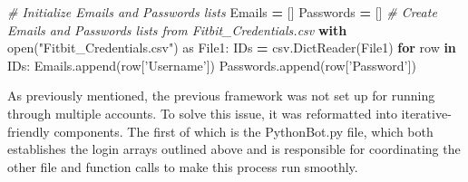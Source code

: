 \documentclass[]{book}
\newenvironment{Shaded}{\begin{snugshade}}{\end{snugshade}}
\newcommand{\BuiltInTok}[1]{#1}
\newcommand{\CommentTok}[1]{\textcolor[rgb]{0.56,0.35,0.01}{\textit{#1}}}
\newcommand{\ControlFlowTok}[1]{\textcolor[rgb]{0.13,0.29,0.53}{\textbf{#1}}}
\newcommand{\ImportTok}[1]{#1}
\newcommand{\KeywordTok}[1]{\textcolor[rgb]{0.13,0.29,0.53}{\textbf{#1}}}
\newcommand{\NormalTok}[1]{#1}
\newcommand{\OperatorTok}[1]{\textcolor[rgb]{0.81,0.36,0.00}{\textbf{#1}}}
\newcommand{\StringTok}[1]{\textcolor[rgb]{0.31,0.60,0.02}{#1}}
\begin{document}
\begin{Shaded}
\begin{Highlighting}[]
\CommentTok{# Initialize Emails and Passwords lists}
\NormalTok{Emails }\OperatorTok{=}\NormalTok{ []}
\NormalTok{Passwords }\OperatorTok{=}\NormalTok{ []}
\CommentTok{# Create Emails and Passwords lists from Fitbit_Credentials.csv}
\ControlFlowTok{with} \BuiltInTok{open}\NormalTok{(}\StringTok{"Fitbit_Credentials.csv"}\NormalTok{) }\ImportTok{as}\NormalTok{ File1:}
\NormalTok{    IDs }\OperatorTok{=}\NormalTok{ csv.DictReader(File1)}
    \ControlFlowTok{for}\NormalTok{ row }\KeywordTok{in}\NormalTok{ IDs:}
\NormalTok{        Emails.append(row[}\StringTok{'Username'}\NormalTok{])}
\NormalTok{        Passwords.append(row[}\StringTok{'Password'}\NormalTok{])}
\end{Highlighting}
\end{Shaded}

As previously mentioned, the previous framework was not set up for running through multiple accounts. To solve this issue, it was reformatted into iterative-friendly components. The first of which is the PythonBot.py file, which both establishes the login arrays outlined above and is responsible for coordinating the other file and function calls to make this process run smoothly.
\end{document}
